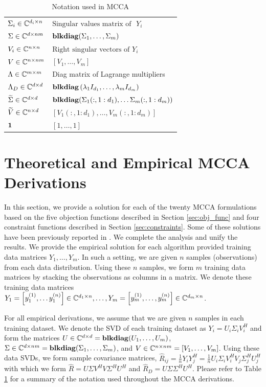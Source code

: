 \begin{table}[h!]
\begin{tabular}{ll}
    $\Sigma_i\in\mathbb{C}^{d_i\times n}$ & $\text{Singular values matrix of }$ $Y_i$\\
    $\Sigma\in\mathbb{C}^{d\times nm}$ & $\mathop{\bf blkdiag}(\Sigma_1,\dots,\Sigma_m)$\\ 
    $V_i\in\mathbb{C}^{n\times n}$ & $\text{Right singular vectors of } Y_i$\\
    $V\in\mathbb{C}^{n\times nm}$ & $[V_1,\dots,V_m]$\\ 
    $\Lambda\in\mathbb{C}^{m\times m}$ & Diag matrix of Lagrange multipliers\\
    $\Lambda_D\in\mathbb{C}^{d\times d}$ & $\mathop{\bf blkdiag}\left(\lambda_1 I_{d_1},\dots,\lambda_m
      I_{d_m}\right)$\\  
    $\widetilde{\Sigma}\in\mathbb{C}^{d\times d}$ & $\mathop{\bf blkdiag}(\Sigma_1(:,1:d_1),\dots
    \Sigma_m(:,1:d_m))$\\ 
    $\widetilde{V}\in\mathbb{C}^{n\times  d}$&$[V_1(:,1:d_1),\dots,V_m(:,1:d_m)]$ \\
    $\mathbf 1$ & $\left[1,\dots,1\right]$\\
    \midrule
  \end{tabular}
  \caption{Notation used in MCCA}
  \label{tab:mcca_notation}
\end{table}

\section{Theoretical and Empirical MCCA Derivations}

In this section, we provide a solution for each of the twenty MCCA formulations based on
the five objection functions described in Section \ref{sec:obj_func} and four constraint
functions described in Section \ref{sec:constraints}. Some of these solutions have been
previously reported in \cite{kettenring1971canonical, nielsen1994analysis}. We complete
the analysis and unify the results. We provide the empirical solution for each algorithm
provided training data matrices $Y_1,\dots, Y_m$. In such a setting, we are given $n$
samples (observations) from each data distribution. Using these $n$ samples, we form $m$
 training data matrices by stacking the observations as columns in a
matrix. We denote these training data matrices $Y_1=\left[y_1^{(1)},\dots
  y_1^{(n)}\right]\in\mathbb{C}^{d_1\times n},\dots, Y_m=\left[y_m^{(1)},\dots,
  y_m^{(n)}\right]\in\mathbb{C}^{d_m\times n}$. 

For all empirical derivations, we assume that we are given $n$ samples in each training
dataset. We denote the SVD of each training dataset as $Y_i=U_i\Sigma_iV_i^H$ and form the
matrices $U\in\mathbb{C}^{d\times d}=\mathop{\bf blkdiag}(U_1,\dots,U_m)$, $\Sigma\in\mathbb{C}^{d\times
  nm}=\mathop{\bf blkdiag}(\Sigma_1,\dots,\Sigma_m)$, and $V\in\mathbb{C}^{n\times nm}=[V_1,\dots,V_m]$.
Using these data SVDs, we form sample covariance matrices,
$\widehat{R}_{ij}=\frac{1}{n}Y_iY_j^H = \frac{1}{n}U_i\Sigma_iV_i^HV_j\Sigma_j^HU_j^H$
with which we form $\widehat{R}=U\Sigma V^HV\Sigma^HU^H$ and
$\widehat{R}_D=U\Sigma\Sigma^HU^H$. Please refer to Table \ref{tab:mcca_notation} for a
summary of the notation used throughout the MCCA derivations.

